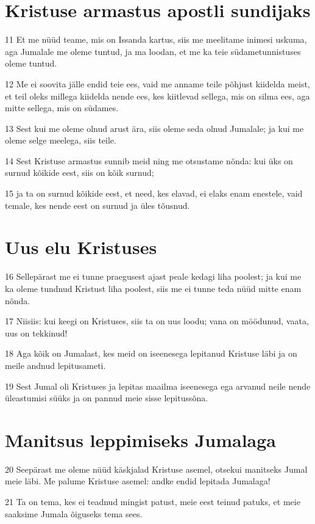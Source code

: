 \section*{Kristuse armastus apostli sundijaks}

\par 11 Et me nüüd teame, mis on Issanda kartus, siis me meelitame inimesi uskuma, aga Jumalale me oleme tuntud, ja ma loodan, et me ka teie südametunnistuses oleme tuntud.
\par 12 Me ei soovita jälle endid teie ees, vaid me anname teile põhjust kiidelda meist, et teil oleks millega kiidelda nende ees, kes kiitlevad sellega, mis on silma ees, aga mitte sellega, mis on südames.
\par 13 Sest kui me oleme olnud arust ära, siis oleme seda olnud Jumalale; ja kui me oleme selge meelega, siis teile.
\par 14 Sest Kristuse armastus sunnib meid ning me otsustame nõnda: kui üks on surnud kõikide eest, siis on kõik surnud;
\par 15 ja ta on surnud kõikide eest, et need, kes elavad, ei elaks enam enestele, vaid temale, kes nende eest on surnud ja üles tõusnud.

\section*{Uus elu Kristuses}

\par 16 Sellepärast me ei tunne praegusest ajast peale kedagi liha poolest; ja kui me ka oleme tundnud Kristust liha poolest, siis me ei tunne teda nüüd mitte enam nõnda.
\par 17 Niisiis: kui keegi on Kristuses, siis ta on uus loodu; vana on möödunud, vaata, uus on tekkinud!
\par 18 Aga kõik on Jumalast, kes meid on iseenesega lepitanud Kristuse läbi ja on meile andnud lepitusameti.
\par 19 Sest Jumal oli Kristuses ja lepitas maailma iseenesega ega arvanud neile nende üleastumisi süüks ja on pannud meie sisse lepitussõna.

\section*{Manitsus leppimiseks Jumalaga}

\par 20 Seepärast me oleme nüüd käskjalad Kristuse asemel, otsekui manitseks Jumal meie läbi. Me palume Kristuse asemel: andke endid lepitada Jumalaga!
\par 21 Ta on tema, kes ei teadnud mingist patust, meie eest teinud patuks, et meie saaksime Jumala õiguseks tema sees.


